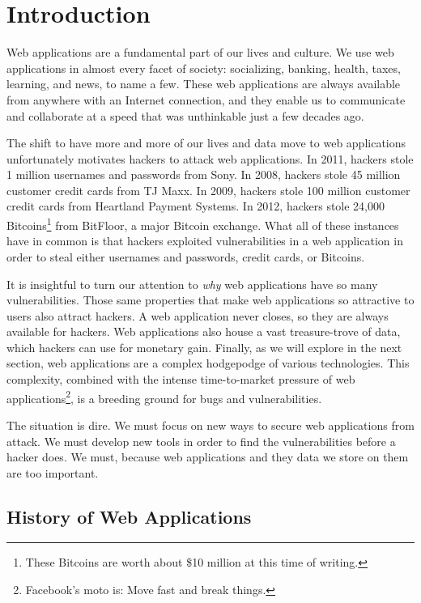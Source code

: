 %
%

\chapter{Introduction}

Web applications are a fundamental part of our lives and culture. We
use web applications in almost every facet of society: socializing,
banking, health, taxes, learning, and news, to name a few. These web
applications are always available from anywhere with an Internet
connection, and they enable us to communicate and collaborate at a
speed that was unthinkable just a few decades ago.

The shift to have more and more of our lives and data move to web
applications unfortunately motivates hackers to attack web
applications. In 2011, hackers stole 1 million usernames and passwords
from Sony. In 2008, hackers stole 45 million customer credit cards
from TJ Maxx. In 2009, hackers stole 100 million customer credit cards
from Heartland Payment Systems. In 2012, hackers stole 24,000
Bitcoins\footnote{These Bitcoins are worth about \$10 million at this
  time of writing.} from BitFloor, a major Bitcoin exchange. What all
of these instances have in common is that hackers exploited
vulnerabilities in a web application in order to steal either
usernames and passwords, credit cards, or Bitcoins.

It is insightful to turn our attention to \emph{why} web applications
have so many vulnerabilities. Those same properties that make web
applications so attractive to users also attract hackers. A web
application never closes, so they are always available for hackers.
Web applications also house a vast treasure-trove of data, which
hackers can use for monetary gain. Finally, as we will explore in the
next section, web applications are a complex hodgepodge of various
technologies. This complexity, combined with the intense time-to-market
pressure of web applications\footnote{Facebook's moto is: Move fast
  and break things.}, is a breeding ground for bugs and
vulnerabilities. 

The situation is dire. We must focus on new ways to secure web
applications from attack. We must develop new tools in order to find
the vulnerabilities before a hacker does. We must, because web
applications and they data we store on them are too important.

\section{History of Web Applications}

